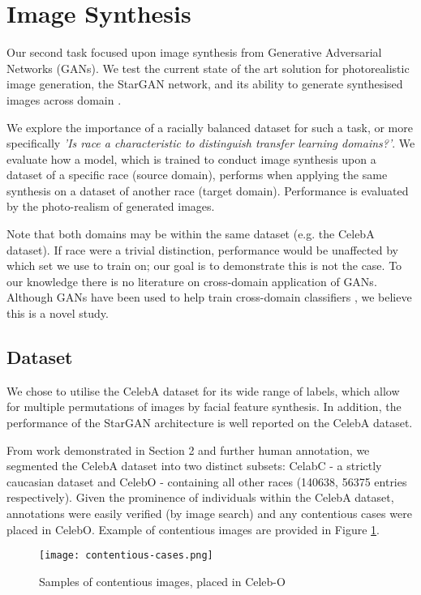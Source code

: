 \documentclass[10pt,twocolumn,letterpaper]{article}
\begin{document}
\section{Image Synthesis}
Our second task focused upon image synthesis from Generative Adversarial Networks (GANs). We test the current state of the art solution for photorealistic image generation, the StarGAN network, and its ability to generate synthesised images across domain \cite{Choi:2017aa}. 

We explore the importance of a racially balanced dataset for such a task, or more specifically \textit{'Is race a characteristic to distinguish transfer learning domains?'}. We evaluate how a model, which is trained to conduct image synthesis upon a dataset of a specific race (source domain), performs when applying the same synthesis on a dataset of another race (target domain). Performance is evaluated by the photo-realism of generated images. 

Note that both domains may be within the same dataset (e.g. the CelebA dataset). If race were a trivial distinction, performance would be unaffected by which set we use to train on; our goal is to demonstrate this is not the case. To our knowledge there is no literature on cross-domain application of GANs. Although GANs have been used to help train cross-domain classifiers \cite{Yoon:2017aa}, we believe this is a novel study.

\subsection{Dataset}
We chose to utilise the CelebA dataset for its wide range of labels, which allow for multiple permutations of images by facial feature synthesis. In addition, the performance of the StarGAN architecture is well reported on the CelebA dataset. 

From work demonstrated in Section 2 and further human annotation, we segmented the CelebA dataset into two distinct subsets: CelabC - a strictly caucasian dataset and CelebO - containing all other races (140638, 56375 entries respectively). Given the prominence of individuals within the CelebA dataset, annotations were easily verified (by image search) and any contentious cases were placed in CelebO. Example of contentious images are provided in Figure \ref{fig:contentious}.


\begin{figure}[ht]
\begin{center}
   \texttt{[image: contentious-cases.png]}
\end{center}
   \caption{ \label{fig:contentious} Samples of contentious images, placed in Celeb-O}
\label{fig:contentious}
\end{figure}
\end{document}
